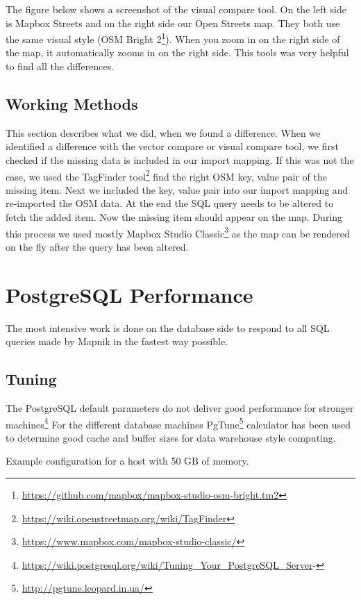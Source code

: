 The figure below shows a screenshot of the visual compare tool. On the left side is Mapbox Streets and on the right side our Open Streets map. They both use the same visual style (OSM Bright 2\footnote{\url{https://github.com/mapbox/mapbox-studio-osm-bright.tm2}}). When you zoom in on the right side of the map, it automatically zooms in on the right side. This tools was very helpful to find all the differences.

\subsection{Working Methods}
This section describes what we did, when we found a difference. When we identified a difference with the vector compare or visual compare tool, we first checked if the missing data is included in our import mapping. If this was not the case, we used the TagFinder tool\footnote{\url{https://wiki.openstreetmap.org/wiki/TagFinder}} find the right OSM key, value pair of the missing item. Next we included the key, value pair into our import mapping and re-imported the OSM data. At the end the SQL query needs to be altered to fetch the added item. Now the missing item should appear on the map. During this process we used mostly Mapbox Studio Classic\footnote{\url{https://www.mapbox.com/mapbox-studio-classic/}} as the map can be rendered on the fly after the query has been altered.

\section{PostgreSQL Performance}
\label{postgres-performance}

The most intensive work is done on the database side to respond to all SQL queries
made by Mapnik in the fastest way possible.

\subsection{Tuning}

The PostgreSQL default parameters do not deliver good performance for stronger machines\footnote{\url{https://wiki.postgresql.org/wiki/Tuning_Your_PostgreSQL_Server}-}
For the different database machines PgTune\footnote{\url{http://pgtune.leopard.in.ua/}} calculator has been used to determine good cache and buffer sizes for data warehouse style computing.

Example configuration for a host with 50 GB of memory.

